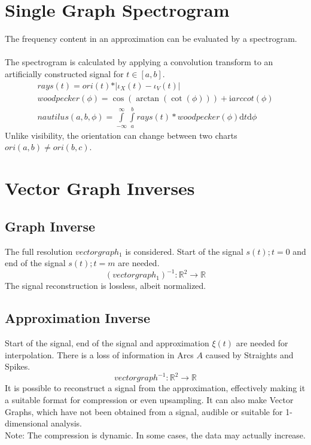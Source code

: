 \documentclass{report}
\begin{document}
\chapter{Single Graph Spectrogram}
The frequency content in an approximation can be evaluated by a spectrogram.\\\\
The spectrogram is calculated by applying a convolution transform to an artificially constructed signal for $t \in [a,b]$.
\begin{align}
rays(t)=ori(t)*\vert\iota_{X}(t)-\iota_{V}(t)\vert\\
woodpecker(\phi)=\cos(\arctan(\cot(\phi))) + \mathrm{i} arccot(\phi)\\
nautilus(a,b,\phi)=\int \limits _{-\infty}^{\infty}\int \limits _{a}^{b}rays(t)*woodpecker(\phi)\mathrm{d}t\mathrm{d}\phi
\end{align}
Unlike visibility, the orientation can change between two charts $ori(a,b)\neq ori(b,c)$.

\chapter{Vector Graph Inverses}
\section{Graph Inverse}
The full resolution $vectorgraph_{1}$ is considered. Start of the signal $s(t);t=0$ and end of the signal $s(t);t=m$ are needed.
\begin{equation}
(vectorgraph_{1})^{-1}: \mathbb{R}^2 \rightarrow \mathbb{R}
\end{equation}
The signal reconstruction is lossless, albeit normalized.
\section{Approximation Inverse}
Start of the signal, end of the signal and approximation $\xi(t)$ are needed for interpolation. There is a loss of information in Arcs $A$ caused by Straights and Spikes.
\begin{equation}
vectorgraph^{-1}: \mathbb{R}^2 \rightarrow \mathbb{R}
\end{equation}
It is possible to reconstruct a signal from the approximation, effectively making it a suitable format for compression or even upsampling. It can also make Vector Graphs, which have not been obtained from a signal, audible or suitable for 1-dimensional analysis.\\
Note: The compression is dynamic. In some cases, the data may actually increase.
\end{document}

